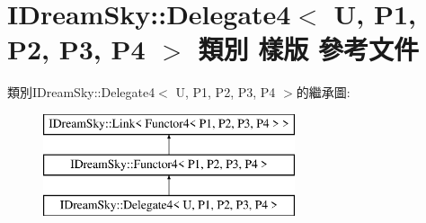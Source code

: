 \hypertarget{class_i_dream_sky_1_1_delegate4}{}\section{I\+Dream\+Sky\+:\+:Delegate4$<$ U, P1, P2, P3, P4 $>$ 類別 樣版 參考文件}
\label{class_i_dream_sky_1_1_delegate4}
類別\+I\+Dream\+Sky\+:\+:Delegate4$<$ U, P1, P2, P3, P4 $>$的繼承圖\+:\begin{figure}[H]
\begin{center}
\leavevmode
\includegraphics[height=3.000000cm]{class_i_dream_sky_1_1_delegate4}
\end{center}
\end{figure}

